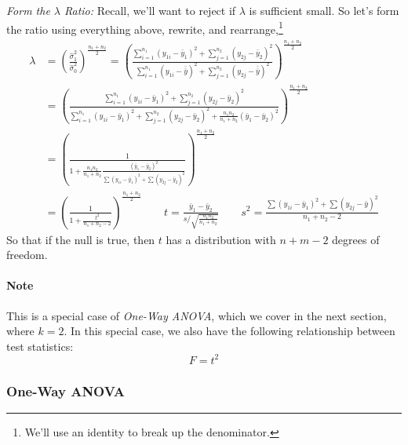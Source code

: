 \documentclass[a4paper,12pt]{scrartcl}
\begin{document}
\newpage
{\sl Form the $\lambda$ Ratio:} Recall, we'll want to reject if
$\lambda$ is sufficient small. So let's form the ratio using
everything above, rewrite, and rearrange,\footnote{We'll use an
identity to break up the denominator.}
\begin{align*}
   \lambda &= \left(\frac{\hat{\sigma}^2_1}{\hat{\sigma}^2_0}
      \right)^{\frac{n_1+n_2}{2}} = \left( \frac{
      \sum^{n_1}_{i=1} (y_{1i} - \bar{y}_1)^2 +
      \sum^{n_2}_{j=1} (y_{2j} - \bar{y}_2)^2}{
      \sum_{i=1}^{n_1} (y_{1i} - \bar{\bar{y}})^2 +
      \sum_{j=1}^{n_2} (y_{2j} - \bar{\bar{y}})^2 }
      \right)^{\frac{n_1+n_2}{2}}\\
      &= \left( \frac{
      \sum^{n_1}_{i=1} (y_{1i} - \bar{y}_1)^2 +
      \sum^{n_2}_{j=1} (y_{2j} - \bar{y}_2)^2}{
      \sum_{i=1}^{n_1} (y_{1i} - \bar{y}_1)^2 +
      \sum_{j=1}^{n_2} (y_{2j} - \bar{y}_2)^2 + \frac{n_1n_2}{n_1+n_2}
      (\bar{y}_1 - \bar{y}_2)^2}
      \right)^{\frac{n_1+n_2}{2}}\\
      &= \left( \frac{1}{
	 1+ \frac{n_1n_2}{n_1+n_2}\frac{(\bar{y}_1 - \bar{y}_2)^2}{
	 \sum (y_{1i} - \bar{y}_1)^2 +
	 \sum (y_{2j} - \bar{y}_2)^2}}
	 \right)^{\frac{n_1+n_2}{2}}\\
      &= \left( \frac{1}{
	 1+ \frac{t^2}{n_1+n_2-2}}\right)^{\frac{n_1+n_2}{2}}
	 \qquad t = \frac{\bar{y}_1 - \bar{y}_2}{s/\sqrt{\frac{n_1n_2}{
	 n_1+n_2}}} \qquad s^2 = \frac{\sum (y_{1i}-\bar{y}_1)^2
	 + \sum (y_{2j} - \bar{y})^2}{n_1+n_2-2}
\end{align*}
So that if the null is true, then $t$ has a distribution with $n+m-2$
degrees of freedom.

\paragraph{Note} This is a special case of \emph{One-Way ANOVA}, which
we cover in the next section, where $k=2$.  In this special case,
we also have the following relationship between test statistics:
   \[ F = t^2 \]

\newpage
\subsubsection{One-Way ANOVA}
\end{document}
